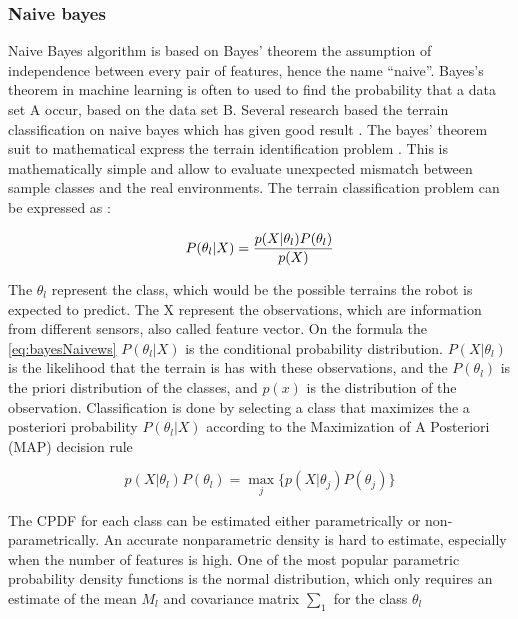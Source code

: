 \documentclass[USenglish]{ifimaster}  %
\begin{document}
\subsubsection{Naive bayes}
Naive Bayes algorithm is based on Bayes’ theorem the assumption of independence between every pair of features, hence the name “naive”. Bayes's theorem in machine learning is often to used to find the probability that a data set A occur, based on the data set B. Several research based the terrain classification on naive bayes which has given good result \cite{6225128, 5981563}. The bayes' theorem suit to mathematical express the terrain identification problem \cite{Giguere06environmentidentification,6225128}. This is mathematically simple and allow to evaluate unexpected mismatch between sample classes and the real environments. The terrain classification problem can be expressed as \cite{6225128}:

\begin{equation}
    P(\theta_{l}\vert X)={p(X\vert \theta_{l})P(\theta_{l})\over p(X)}
    \label{eq:bayesNaivews}
\end{equation}

The $\theta_{l}$ represent the class, which would be the possible terrains the robot is expected to predict. The X represent the observations, which are information from different sensors, also called feature vector. On the formula the \ref{eq:bayesNaivews} $P(\theta_{l}\vert X)$ is the conditional probability distribution. $P(X\vert \theta_{l})$ is the likelihood that the terrain is has with these observations, and the $P(\theta_{l})$ is the priori distribution of the classes, and $p(x)$ is the
distribution of the observation. Classification is done by selecting a class that maximizes the a posteriori probability $P(\theta_{l}\vert X)$ according to the Maximization of A Posteriori (MAP) decision rule

\begin{equation}
    p(X\vert \theta_{l})P(\theta_{l})=\displaystyle\mathop{\max}_{j}\{p(X\vert \theta_{j})P(\theta_{j})\}
    \label{eq:decision}
\end{equation}

The CPDF for each class can be estimated either parametrically or non-parametrically. An accurate nonparametric density is hard to estimate, especially when the number of features is high. One of the most popular parametric probability density functions is the normal distribution, which only requires an estimate of the mean $M_l$ and covariance matrix $\sum_1$ for the class $\theta_l$
\end{document}

